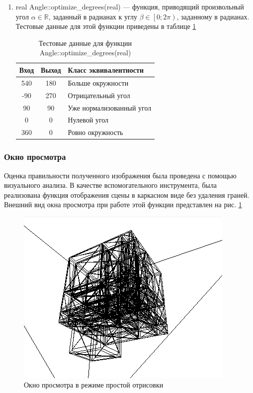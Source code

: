 \begin{enumerate}
	\item real Angle::optimize\_degrees(real) --- функция, приводящий произвольный угол $\alpha\in\mathbb{R}$, заданный в радианах к углу $\beta\in\left[0; 2\pi\right)$, заданному в радианах. Тестовые данные для этой функции приведены в таблице \ref{tbl:optimize_degrees}
	\begin{table}[!ht]
		\centering
		\caption{Тестовые данные для функции Angle::optimize\_degrees(real)}
		\label{tbl:optimize_degrees}
		\begin{tabular}{|c|c|l|}
			\hline
			Вход & Выход & Класс эквивалентности \\
			\hline
			540 & 180 & Больше окружности\\
			-90 & 270 & Отрицательный угол\\
			90 & 90 & Уже нормализованный угол\\
			0 & 0 & Нулевой угол\\
			360 & 0 & Ровно окружность\\
			\hline
		\end{tabular}
	\end{table}
\end{enumerate}

\subsubsection{Окно просмотра}
Оценка правильности полученного изображения была проведена с помощью визуального анализа. В качестве вспомогательного инструмента, была реализована функция отображения сцены в каркасном виде без удаления граней. Внешний вид окна просмотра при работе этой функции представлен на рис. \ref{fig:scenecarcass}

\begin{figure}[ht]
	\centering
	\includegraphics[width=0.7\linewidth]{img/scene_carcass}
	\caption{Окно просмотра в режиме простой отрисовки}
	\label{fig:scenecarcass}
\end{figure}


